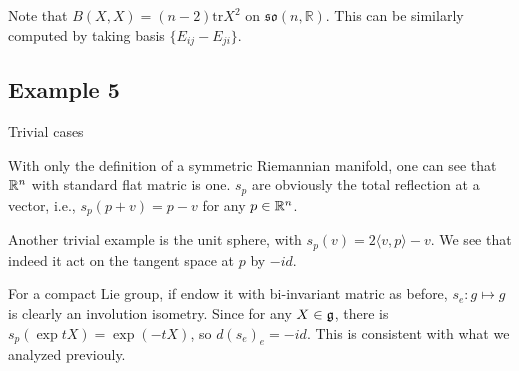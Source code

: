 	Note that $B(X,X)=(n-2)\mathrm{tr}X^2$ on
	$\mathfrak{so}(n,\mathbb R)$. This can be similarly computed
	by taking basis $\{E_{ij}-E_{ji}\}$.
	
	\subsection{Example 5}
	\begin{center}
		Trivial cases
	\end{center}
	
	With only the definition of a symmetric Riemannian manifold,
	one can see that ${\mathbb R}^n$ with standard flat matric is one.
	$s_p$ are obviously the total reflection at a vector, i.e.,
	$s_p(p+v)=p-v$ for any $p\in {\mathbb R}^n$. 
	
	Another trivial example is the unit sphere, with
	$s_p(v)=2\langle v,p\rangle-v$. We see that indeed it act on
	the tangent space at $p$ by $-id$. 
	
	For a compact Lie group, if endow it with bi-invariant matric
	as before, $s_e:g\mapsto g$ is clearly an involution
	isometry. Since for any $X\in{\mathfrak g}$, there is $s_p(\exp
	tX)=\exp(-tX)$, so $d(s_e)_e=-id$. This is consistent with
	what we analyzed previouly.